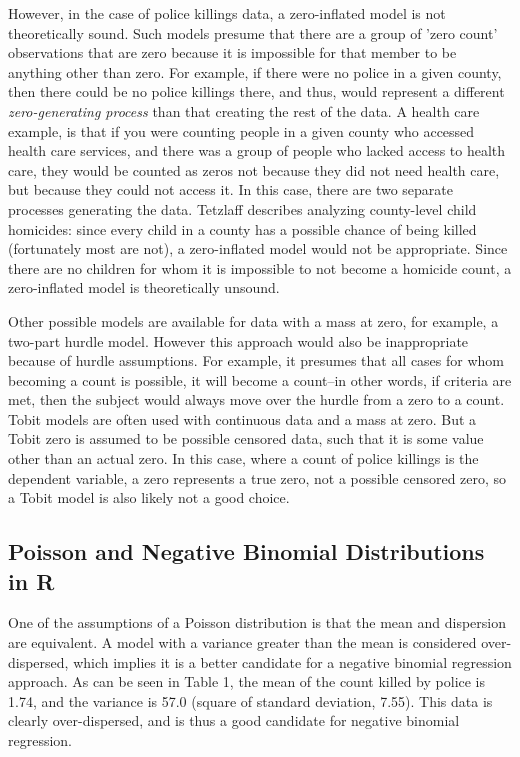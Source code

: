 \documentclass[sigconf]{acmart}
\begin{document}
However, in the case of police killings data, a zero-inflated model is not theoretically sound.  Such models presume that there are a group of 'zero count' observations that are zero because it is impossible for that member to be anything other than zero.  For example, if there were no police in a given county, then there could be no police killings there, and thus, would represent a different {\em zero-generating process} than that creating the rest of the data. \cite{min02,feng16,neelon16} A health care example, is that if you were counting people in a given county who accessed health care services, and there was a group of people who lacked access to health care, they would be counted as zeros not because they did not need health care, but because they could not access it. In this case, there are two separate processes generating the data. \cite{neelon16} Tetzlaff describes analyzing county-level child homicides: since every child in a county has a possible chance of being killed (fortunately most are not), a zero-inflated model would not be appropriate. Since there are no children for whom it is impossible to not become a homicide count, a zero-inflated model is theoretically unsound. \cite{tetzlaff13}

Other possible models are available for data with a mass at zero, for example, a two-part hurdle model.  However this approach would also be inappropriate because of hurdle assumptions.  For example, it presumes that all cases for whom becoming a count is possible, it will become a count--in other words, if criteria are met, then the subject would always move over the hurdle from a zero to a count. \cite{moore04, feng16}  Tobit models are often used with continuous data and a mass at zero.  But a Tobit zero is assumed to be possible censored data, such that it is some value other than an actual zero.  In this case, where a count of police killings is the dependent variable, a zero represents a true zero, not a possible censored zero, so a Tobit model is also likely not a good choice. \cite{neelon16,min02}  

\subsection{Poisson and Negative Binomial Distributions in R}
One of the assumptions of a Poisson distribution is that the mean and dispersion are equivalent. A model with a variance greater than the mean is considered over-dispersed, which implies it is a better candidate for a negative binomial regression approach. \cite{fox15,beaujean16,smith14,legewie15}  As can be seen in Table 1, the mean of the count killed by police is 1.74, and the variance is 57.0 (square of standard deviation, 7.55).  This data is clearly over-dispersed, and is thus a good candidate for negative binomial regression.  
\end{document}
